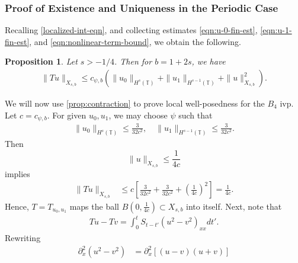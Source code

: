 \documentclass[12pt,reqno]{amsart}
\numberwithin{equation}{section}  %
\numberwithin{figure}{section}
\newcommand{\ci}{\mathbb{T}}
\newcommand{\p}{\partial}
\theoremstyle{plain}
\newtheorem{proposition}{Proposition}
\theoremstyle{definition}
\theoremstyle{remark}
\begin{document}
\subsubsection{Proof of Existence and Uniqueness in the Periodic Case}
\label{sssec:proof-b4-per-case}
%
%
Recalling \eqref{localized-int-eqn}, and collecting estimates \eqref{eqn:u-0-fin-est}, \eqref{eqn:u-1-fin-est}, and
\eqref{eqn:nonlinear-term-bound}, we obtain the following.
%
%				 
%
\begin{proposition}
\label{prop:contraction}
Let  $s > -1/4$. Then for $b = 1 + 2s$, we have
%
\begin{equation*}
	\begin{split}
    \|Tu\|_{X_{s,b}} \le c_{\psi, b} \left( \|u_0 \|_{H^s(\ci)} + \|u_1 \|_{H^{s-1}(\ci)}
    + \|u\|_{X_{s,b}}^2 
		\right).
	\end{split}
\end{equation*}
%
\end{proposition}
We will now use \autoref{prop:contraction} to prove local well-posedness for the 
$B_4$ ivp. Let $c = c_{\psi, b}$. For given $u_0, u_1$, we may choose $\psi$ such
that 
%
\begin{equation*}
	\begin{split}
    \|u_0\|_{H^s(\ci)} \le \frac{3}{32c^2}, \quad \|u_1\|_{H^{s-1}(\ci)} \le \frac{3}{32c^2}.
	\end{split}
\end{equation*}
%
Then $$\|u\|_{X_{s,b}} \le \frac{1}{4c}$$ implies
%
\begin{equation*}
	\begin{split}
		\|T u \|_{X_{s,b}} 
		& \le c \left[ \frac{3}{32c^2} + \frac{3}{32c^2}+ \left( 
		\frac{1}{4c} \right)^2 \right]
		=  \frac{1}{4c}.
	\end{split}
\end{equation*}
%
Hence, $T=T_{u_0, u_1}$ maps the ball $B\left( 0, \frac{1}{4c} \right) \subset
X_{s,b}$ into itself. Next, note that 
%
\begin{equation*}
	\begin{split}
		Tu - Tv = 
    \int_{0}^{t} S_{t-t'}
    (u^{2} - v^{2})_{xx} dt'.
  \end{split}
  \label{eqn:integral-form-dif}
\end{equation*}
%
Rewriting
%
\begin{equation*}
	\begin{split}
	\p_x^2 (u^2 - v^2)	
		& = \p_x^2[(u-v)(u+v)]
		\end{split}
\end{equation*}
\end{document}
